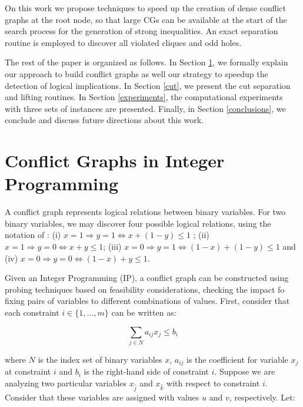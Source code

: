 \documentclass{endm}
\begin{document}
On this work we propose techniques to speed up the creation of dense conflict graphs at the root node, so that large CGs can be available at the start of the search process for the generation of strong inequalities. An exact separation routine is employed to discover all violated cliques and odd holes. 

The rest of the paper is organized as follows. In Section \ref{seccgraph}, we formally explain our approach to build conflict graphs as well our strategy to speedup the detection of logical implications. In Section \ref{cut}, we present the cut separation and lifting routines. In Section \ref{experiments}, the computational experiments with three sets of instances are presented. Finally, in Section \ref{conclusions}, we conclude and discuss future directions about this work.

\section{Conflict Graphs in Integer Programming}\label{seccgraph}

A conflict graph represents logical relations between binary variables. For two binary variables, we may discover four possible logical relations, using the notation of \cite{atamturk}: (i) $x = 1 \Rightarrow y = 1 \Longleftrightarrow x + (1 - y)  \leq 1$ ; (ii) $x=1 \Rightarrow y = 0 \Longleftrightarrow x + y \leq 1$; (iii) $x = 0 \Rightarrow y = 1 \Longleftrightarrow  (1 - x) + (1 - y) \leq 1$ and (iv) $x = 0 \Rightarrow y = 0 \Longleftrightarrow (1 - x) + y \leq 1$.

Given an Integer Programming (IP), a conflict graph can be constructed using probing techniques based on feasibility considerations\cite{atamturk,achterberg,sandholm}, checking the impact fo fixing pairs of variables to different combinations of values. First, consider that each constraint $i \in \{1,\ldots,m\}$ can be written as:

\begin{equation}
 \sum_{j \in N} a_{ij}x_{j} \leq b_{i} 
\end{equation}

\noindent where $N$ is the index set of binary variables $x$, $a_{ij}$ is the coefficient for variable $x_{j}$ at constraint $i$ and $b_{i}$ is the right-hand side of constraint $i$. Suppose we are analyzing two particular variables $x_{\hat{j}}$ and $x_{\hat{k}}$ with respect to constraint $i$. Consider that these variables are assigned with values $u$ and $v$, respectively. Let:
\end{document}
